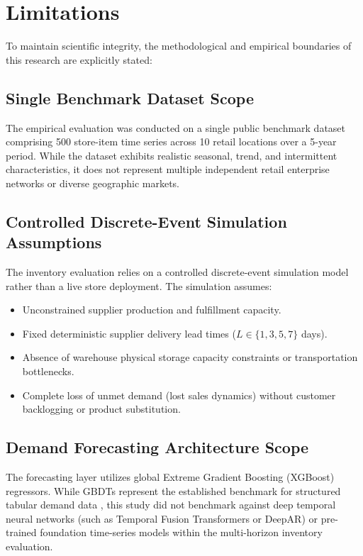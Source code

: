 \section{Limitations}

To maintain scientific integrity, the methodological and empirical boundaries of this research are explicitly stated:

\subsection{Single Benchmark Dataset Scope}
The empirical evaluation was conducted on a single public benchmark dataset comprising 500 store-item time series across 10 retail locations over a 5-year period. While the dataset exhibits realistic seasonal, trend, and intermittent characteristics, it does not represent multiple independent retail enterprise networks or diverse geographic markets.

\subsection{Controlled Discrete-Event Simulation Assumptions}
The inventory evaluation relies on a controlled discrete-event simulation model rather than a live store deployment. The simulation assumes:
\begin{itemize}
    \item Unconstrained supplier production and fulfillment capacity.
    \item Fixed deterministic supplier delivery lead times ($L \in \{1, 3, 5, 7\}$ days).
    \item Absence of warehouse physical storage capacity constraints or transportation bottlenecks.
    \item Complete loss of unmet demand (lost sales dynamics) without customer backlogging or product substitution.
\end{itemize}

\subsection{Demand Forecasting Architecture Scope}
The forecasting layer utilizes global Extreme Gradient Boosting (XGBoost) regressors. While GBDTs represent the established benchmark for structured tabular demand data \cite{makridakis2022m5, chen2016xgboost}, this study did not benchmark against deep temporal neural networks (such as Temporal Fusion Transformers or DeepAR) or pre-trained foundation time-series models within the multi-horizon inventory evaluation.

